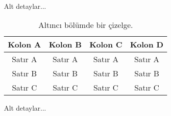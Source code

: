 Alt detaylar...

\begin{table*}[b]
{\setlength{\tabcolsep}{14pt}
\caption{Alt\i nc{\i} b\"ol\"umde bir \c{c}izelge.}
\begin{center}
\vspace{-6mm}
\begin{tabular}{cccc}
\hline\hline
Kolon A & Kolon B & Kolon C & Kolon D \\
\hline
Sat\i r A & Sat\i r A & Sat\i r A & Sat\i r A \\
Sat\i r B & Sat\i r B & Sat\i r B & Sat\i r B \\
Sat\i r C & Sat\i r C & Sat\i r C & Sat\i r C \\
\hline
\end{tabular}
\vspace{-6mm}
\end{center}
\label{tableforCh6-1}}
\end{table*}

Alt detaylar...